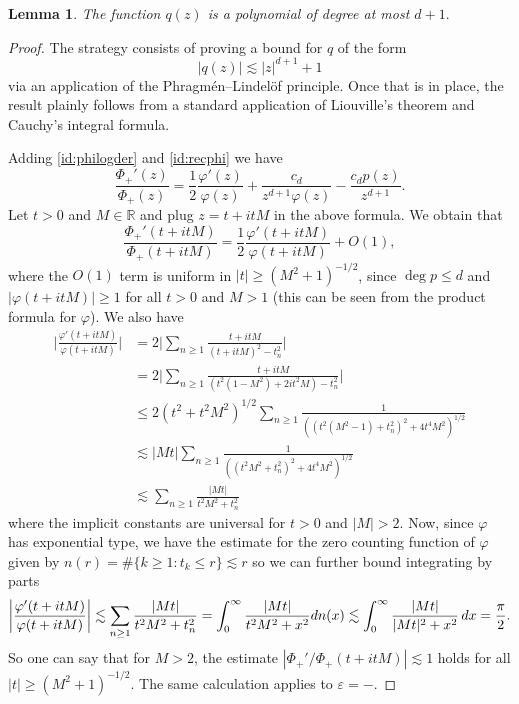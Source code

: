 \documentclass[10pt,a4paper]{amsart}
\newtheorem{lemma}{Lemma}
\renewcommand{\P}{\Phi}
\renewcommand{\d}{{\rm d}}
\newcommand{\ep}{\varepsilon}
\newcommand{\p}{\varphi}
\renewcommand{\r}{\mathbb{R}}
\begin{document}
\begin{lemma}\label{lem:q_poly} The function $q(z)$ is a polynomial of degree at most $d+1.$
\end{lemma}

\begin{proof}
The strategy consists of proving a bound for $q$ of the form
\begin{equation*}
    |q(z)| \lesssim|z|^{d+1} + 1
\end{equation*}
via an application of the Phragmén--Lindelöf principle. Once that is in place, the result plainly follows from a standard application of Liouville's theorem and Cauchy's integral formula.


Adding \eqref{id:philogder} and \eqref{id:recphi} we have
\begin{equation}\label{id:logDerPhiPlus}
    \frac{\Phi_+'(z)}{\P_+(z)}  = \frac{1}{2} \frac{\varphi'(z)}{\varphi(z)} + \frac{ c_d}{z^{d+1} \varphi(z)} - \frac{c_d p(z)}{z^{d+1}}.
\end{equation}
Let $t>0$ and $M \in \r$ and plug $z =t + i tM $ in the above formula. We obtain that
\begin{equation*}
    \frac{\Phi_+'(t + itM )}{\P_+(t + itM)}  = \frac{1}{2} \frac{\varphi'(t + itM )}{\varphi(t + itM )} + O(1),
\end{equation*}
where the $O(1)$ term is uniform in $|t| \geq (M^2 + 1)^{-1/2}$, since $\deg p \leq d$ and $|\varphi(t + it M)| \geq 1$ for all $t > 0$ and $M > 1$ (this can be seen from the product formula for $\p$).
We also have
\begin{align*}
    \bigg|\frac{\varphi'(t + itM)}{\varphi(t + itM)} \bigg|&=  2 \bigg|\sum_{n\geq 1} \frac{t + itM}{(t + itM)^2 - t_n^2}\bigg| \\
    &= 2 \bigg|\sum_{n\geq 1} \frac{t + itM}{(t^2(1- M^2) +2it^2M )- t_n^2}\bigg|\\
    &\leq 2(t^2 + t^2 M^2 )^{1/2} \sum_{n\geq 1} \frac{1 }{((t^2( M^2 -1) + t_n^2 )^2+ 4t^4 M^2)^{1/2}}\\
    &\lesssim |Mt| \sum_{n\geq 1} \frac{1 }{((t^2 M^2 + t_n^2 )^2+ 4t^4 M^2)^{1/2}}\\
    &\lesssim   \sum_{n\geq 1} \frac{|Mt| }{t^2 M^2 + t_n^2 } 
\end{align*}
where the implicit constants are universal for $t > 0$ and $|M| > 2$. Now, since $\p$ has exponential type, we have the estimate for the zero counting function of $\p$ given by $n(r) =  \# \{ k  \geq 1 : t_k \leq r \} \lesssim r$ so we can further bound integrating by parts
\begin{equation*}
    \bigg|\frac{\varphi'(t + itM)}{\varphi(t + itM)} \bigg| \lesssim \sum_{n\geq 1} \frac{|Mt| }{t^2 M^2 + t_n^2 }  =  \int_{0}^\infty \frac{|Mt| }{t^2 M^2 + x^2 } \d n(x)\lesssim \int_0^\infty \frac{|Mt|}{|Mt|^2 + x^2} \, \d x = \frac{\pi}{2}. 
\end{equation*}
So one can say that for $M > 2$, the estimate $|\P_+'/\P_+ (t +itM)| \lesssim 1$ holds for all $|t| \geq (M^2 + 1)^{-1/2}.$ The same calculation applies to $\ep = -$.



\end{proof}
\end{document}
